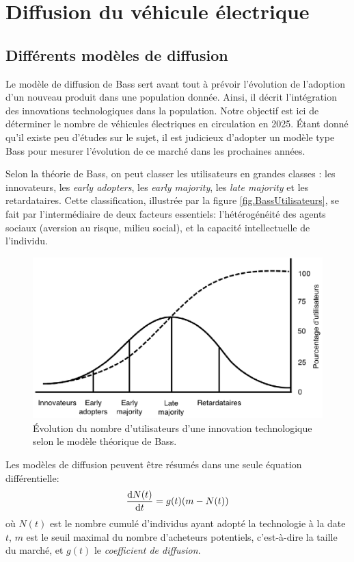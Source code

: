 \section{Diffusion du véhicule électrique}

	\subsection{Différents modèles de diffusion}
	
		Le modèle de diffusion de Bass sert avant tout à prévoir l'évolution de l'adoption d'un nouveau produit dans une population donnée. Ainsi, il décrit l'intégration des innovations technologiques dans la population. Notre objectif est ici de déterminer le nombre de véhicules électriques en circulation en 2025. Étant donné qu'il existe peu d'études sur le sujet, il est judicieux d'adopter un modèle type Bass pour mesurer l'évolution de ce marché dans les prochaines années.
		
		
		Selon la théorie de Bass, on peut classer les utilisateurs en grandes classes : les innovateurs, les \emph{early adopters}, les \emph{early majority}, les \emph{late majority} et les retardataires. Cette classification, illustrée par la figure \vref{fig.BassUtilisateurs}, se fait par l'intermédiaire de deux facteurs essentiels: l'hétérogénéité des agents sociaux (aversion au risque, milieu social), et la capacité intellectuelle de l'individu.
		
		\begin{figure}[!h]
			\centering
			\includegraphics{fig/BassUtilisateurs.eps}
			\caption{Évolution du nombre d'utilisateurs d'une innovation technologique selon le modèle théorique de Bass. \label{fig.BassUtilisateurs}}
		\end{figure}
		
		Les modèles de diffusion peuvent être résumés dans une seule équation différentielle: 
		\[
			\dfrac{\mathrm{d} N(t)}{\mathrm{d} t} = g(t)(m-N(t))
		\]
		où $N(t)$ est le nombre cumulé d'individus ayant adopté la technologie à la date $t$, $m$ est le seuil maximal du nombre d'acheteurs potentiels, c'est-à-dire la taille du marché, et $g(t)$ le \emph{coefficient de diffusion}.
		
